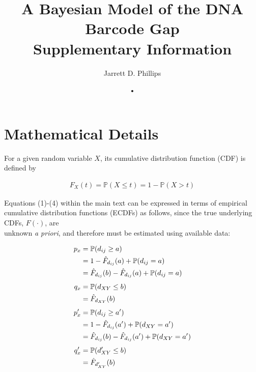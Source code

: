 \documentclass[12pt]{article}
\begin{document}
\title{A Bayesian Model of the DNA Barcode Gap \\ \vspace{5mm} Supplementary Information}

\author{Jarrett D. Phillips}

\date{•}

\maketitle

\section{Mathematical Details}

For a given random variable $X$, its cumulative distribution function (CDF) is defined by

\begin{align}
F_X(t) = \mathbb{P}(X \leq t) = 1 - \mathbb{P}(X > t) 
\end{align}

\noindent Equations (1)-(4) within the main text can be expressed in terms of empirical cumulative distribution functions (ECDFs) as follows, since the true underlying CDFs, $F(\cdot)$, are \\ unknown \textit{a priori}, and therefore must be estimated using available data:

\begin{align}
p_x  &= \mathbb{P}(d_{ij} \geq a) \notag \\
     &= 1 - \hat{F}_{d_{ij}}(a) + \mathbb{P}(d_{ij} = a) \notag \\
     &= \hat{F}_{d_{ij}}(b) - \hat{F}_{d_{ij}}(a) +  \mathbb{P}(d_{ij} = a) \\[1ex]
q_x  &=  \mathbb{P}(d_{XY} \leq b) \notag \\
     &= \hat{F}_{d_{XY}}(b) \\[1ex]
p'_x &=  \mathbb{P}(d_{ij} \geq a') \notag \\
     &= 1 - \hat{F}_{d_{ij}}(a') +  \mathbb{P}(d_{XY} = a') \notag \\
     &= \hat{F}_{d_{ij}}(b) - \hat{F}_{d_{ij}}(a') +  \mathbb{P}(d_{XY} = a')  \\[1ex]
q'_x &=  \mathbb{P}(d'_{XY} \leq b) \notag \\
     &= \hat{F}_{d'_{XY}}(b)
\end{align}
\end{document}
